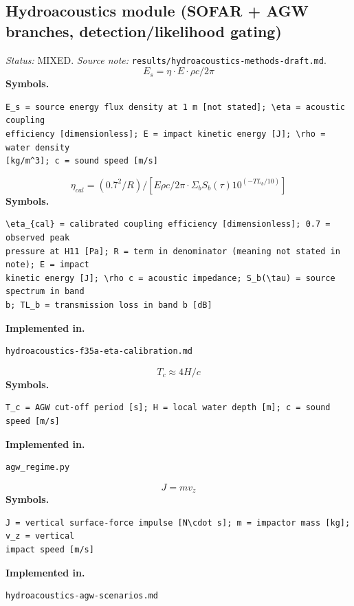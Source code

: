 \documentclass[11pt,a4paper]{article}
\begin{document}
\subsection{Hydroacoustics module (SOFAR + AGW branches, detection/likelihood gating)}
\noindent\textit{Status:} MIXED. \textit{Source note:} \texttt{results/hydroacoustics-methods-draft.md}.
\medskip
\begin{equation}
E_s = \eta \cdot E \cdot \rho c / 2\pi
\end{equation}
\noindent\textbf{Symbols.}
\begin{verbatim}
E_s = source energy flux density at 1 m [not stated]; \eta = acoustic coupling
efficiency [dimensionless]; E = impact kinetic energy [J]; \rho = water density
[kg/m^3]; c = sound speed [m/s]
\end{verbatim}
\medskip
\begin{equation}
\eta_{cal} = (0.7^2/R) / [E \rho c/2\pi \cdot \Sigma_b S_b(\tau) 10^{(-TL_b/10)}]
\end{equation}
\noindent\textbf{Symbols.}
\begin{verbatim}
\eta_{cal} = calibrated coupling efficiency [dimensionless]; 0.7 = observed peak
pressure at H11 [Pa]; R = term in denominator (meaning not stated in note); E = impact
kinetic energy [J]; \rho c = acoustic impedance; S_b(\tau) = source spectrum in band
b; TL_b = transmission loss in band b [dB]
\end{verbatim}
\noindent\textbf{Implemented in.}
\begin{verbatim}
hydroacoustics-f35a-eta-calibration.md
\end{verbatim}
\medskip
\begin{equation}
T_c \approx 4H/c
\end{equation}
\noindent\textbf{Symbols.}
\begin{verbatim}
T_c = AGW cut-off period [s]; H = local water depth [m]; c = sound speed [m/s]
\end{verbatim}
\noindent\textbf{Implemented in.}
\begin{verbatim}
agw_regime.py
\end{verbatim}
\medskip
\begin{equation}
J = m v_z
\end{equation}
\noindent\textbf{Symbols.}
\begin{verbatim}
J = vertical surface-force impulse [N\cdot s]; m = impactor mass [kg]; v_z = vertical
impact speed [m/s]
\end{verbatim}
\noindent\textbf{Implemented in.}
\begin{verbatim}
hydroacoustics-agw-scenarios.md
\end{verbatim}
\medskip
\end{document}
